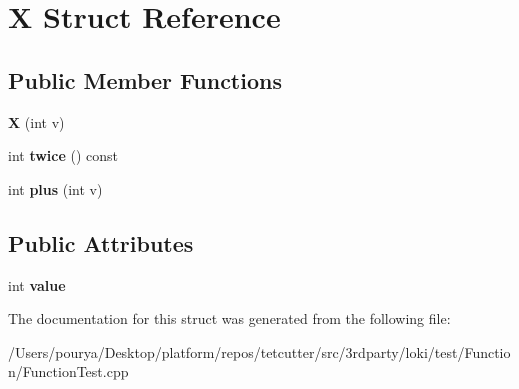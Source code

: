 \hypertarget{structX}{}\section{X Struct Reference}
\label{structX}
\subsection*{Public Member Functions}
\begin{DoxyCompactItemize}
\item 
\hypertarget{structX_a417f3e5a0976ddb35298a134854696bb}{}{\bfseries X} (int v)\label{structX_a417f3e5a0976ddb35298a134854696bb}

\item 
\hypertarget{structX_a1399a8ccbe37237b8f310408e9b97b1d}{}int {\bfseries twice} () const \label{structX_a1399a8ccbe37237b8f310408e9b97b1d}

\item 
\hypertarget{structX_a7e2742eaa8030e060f2b5f1f31b4f8b8}{}int {\bfseries plus} (int v)\label{structX_a7e2742eaa8030e060f2b5f1f31b4f8b8}

\end{DoxyCompactItemize}
\subsection*{Public Attributes}
\begin{DoxyCompactItemize}
\item 
\hypertarget{structX_ae9b94b36ce7c41a476b741b4d7b3b38b}{}int {\bfseries value}\label{structX_ae9b94b36ce7c41a476b741b4d7b3b38b}

\end{DoxyCompactItemize}


The documentation for this struct was generated from the following file\+:\begin{DoxyCompactItemize}
\item 
/\+Users/pourya/\+Desktop/platform/repos/tetcutter/src/3rdparty/loki/test/\+Function/Function\+Test.\+cpp\end{DoxyCompactItemize}

